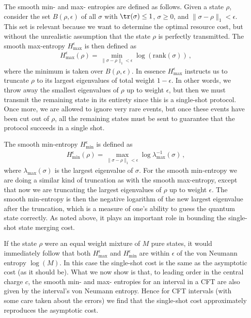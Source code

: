 \documentclass[12pt]{article}
\newcommand{\beq}{\begin{eqnarray}}
\newcommand{\eeq}{\end{eqnarray}}
\newcommand{\Hmax}{H_{\max}}
\newcommand{\Hmin}{H_{\min}}
\newcommand{\lamm}{\lambda_{\max}}
\begin{document}
The smooth min- and max- entropies are defined as follows. Given a state $\rho$, consider the set $B(\rho,\epsilon)$ of all $\sigma$ with $\tr(\sigma)\leq 1$, $\sigma \geq 0 $, and $\|\sigma - \rho\|_1 < \epsilon$. This set is relevant because we want to determine the optimal resource cost, but without the unrealistic assumption that the state $\rho$ is perfectly transmitted. The smooth max-entropy $\Hmax^\epsilon$ is then defined as
\beq
\Hmax^\epsilon(\rho) = \min_{\|\sigma -\rho\|_1 < \epsilon} \log(\text{rank}(\sigma))\,,
\eeq
where the minimum is taken over $B(\rho,\epsilon)$. In essence $\Hmax^\epsilon$ instructs us to truncate $\rho$ to its largest eigenvalues of total weight $1-\epsilon$. In other words, we throw away the smallest eigenvalues of $\rho$ up to weight $\epsilon$, but then we must transmit the remaining state in its entirety since this is a single-shot protocol. Once more, we are allowed to ignore very rare events, but once these events have been cut out of $\rho$, all the remaining states must be sent to guarantee that the protocol succeeds in a single shot.

The smooth min-entropy $\Hmin^\epsilon$ is defined as
\beq
\Hmin^\epsilon(\rho) = \max_{\|\sigma-\rho\|_1 < \epsilon} \log\lamm^{-1}(\sigma)\,,
\eeq
where $\lamm(\sigma)$ is the largest eigenvalue of $\sigma$. For the smooth min-entropy we are doing a similar kind of truncation as with the smooth max-entropy, except that now we are truncating the largest eigenvalues of $\rho$ up to weight $\epsilon$. The smooth min-entropy is then the negative logarithm of the new largest eigenvalue after the truncation, which is a measure of one's ability to guess the quantum state correctly. As noted above, it plays an important role in bounding the single-shot state merging cost.

If the state $\rho$ were an equal weight mixture of $M$ pure states, it would immediately follow that both $\Hmax^\epsilon$ and $\Hmin^\epsilon$ are within $\epsilon$ of the von Neumann entropy $\log(M)$. In this case the single-shot cost is the same as the asymptotic cost (as it should be). What we now show is that, to leading order in the central charge $c$, the smooth min- and max- entropies for an interval in a CFT are also given by the interval's von Neumann entropy. Hence for CFT intervals (with some care taken about the errors) we find that the single-shot cost approximately reproduces the asymptotic cost.
\end{document}
